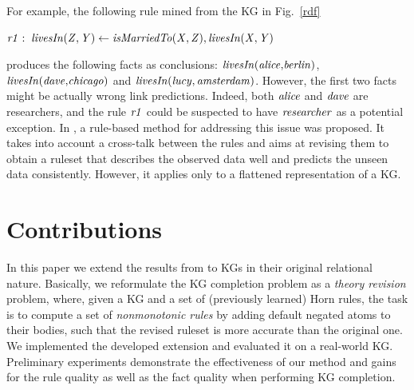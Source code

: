 For example, the following rule mined from the KG in Fig.~\ref{rdf} 
\begin{center}
$\mathit{r1:\;livesIn(Z,Y)\leftarrow isMarriedTo(X,Z), livesIn(X,Y)}$ 
\end{center}
produces the following facts as conclusions: ${\mathit{livesIn(alice{,}berlin)}}${,} ${\mathit{livesIn(dave{,}chicago)}}$ and ${\mathit{livesIn(lucy,amsterdam)}}$. However, the first two facts might be actually wrong link predictions.
Indeed, both $\mathit{alice}$ and $\mathit{dave}$ are researchers, and the rule $\mathit{r1}$ could be suspected to have $\mathit{researcher}$ as a potential exception. In \cite{iswc2016}, a rule-based method for addressing this issue was proposed. It takes into account a cross-talk between the rules and aims at revising them to obtain a ruleset that describes the observed data well and predicts the unseen data consistently. However, it applies only to a flattened representation of a KG.

\section{Contributions}

In this paper we extend the results from \cite{iswc2016} to KGs in their original relational nature. %
Basically, we reformulate the KG completion problem as a \textit{theory revision} problem, %
where, given a KG and a set of (previously learned) Horn rules, the task is to compute a set of \textit{nonmonotonic rules} by adding default negated atoms to their bodies, such that the revised ruleset is more accurate than the original one.
We implemented %
the developed extension and evaluated %
it on a real-world KG. 
Preliminary %
experiments demonstrate the %
effectiveness of our method and gains for the rule quality as well as the fact quality when performing KG completion. %

